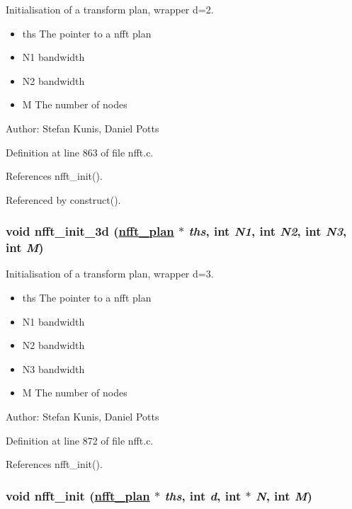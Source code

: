 Initialisation of a transform plan, wrapper d=2. 

\begin{itemize}
\item ths The pointer to a nfft plan \item N1 bandwidth \item N2 bandwidth \item M The number of nodes\end{itemize}
\begin{Desc}
\item[Author:]Stefan Kunis, Daniel Potts \end{Desc}


Definition at line 863 of file nfft.c.

References nfft\_\-init().

Referenced by construct().\hypertarget{group__nfft_ga6}{
\subsubsection[nfft\_\-init\_\-3d]{\setlength{\rightskip}{0pt plus 5cm}void nfft\_\-init\_\-3d (\hyperlink{structnfft__plan}{nfft\_\-plan} $\ast$ {\em ths}, int {\em N1}, int {\em N2}, int {\em N3}, int {\em M})}}
\label{group__nfft_ga6}


Initialisation of a transform plan, wrapper d=3. 

\begin{itemize}
\item ths The pointer to a nfft plan \item N1 bandwidth \item N2 bandwidth \item N3 bandwidth \item M The number of nodes\end{itemize}
\begin{Desc}
\item[Author:]Stefan Kunis, Daniel Potts \end{Desc}


Definition at line 872 of file nfft.c.

References nfft\_\-init().\hypertarget{group__nfft_ga7}{
\subsubsection[nfft\_\-init]{\setlength{\rightskip}{0pt plus 5cm}void nfft\_\-init (\hyperlink{structnfft__plan}{nfft\_\-plan} $\ast$ {\em ths}, int {\em d}, int $\ast$ {\em N}, int {\em M})}}
\label{group__nfft_ga7}


